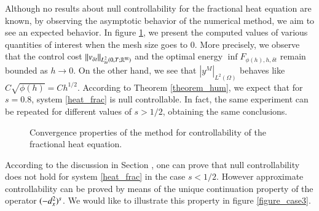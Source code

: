 Although no results about null controllability for the fractional heat equation are known, by observing the asymptotic behavior of the numerical method, we aim to see an expected behavior. In figure \ref{figure_case1}, we present the computed values of various quantities of interest when the mesh size goes to $0$. More precisely, we observe that the control cost $\|v_{\delta t}\|_{L^2_{\delta t}(0,T;\mathbb R^{\mathfrak{M}})}$ and the optimal energy $\inf F_{\phi(h),h,\delta t}$ remain bounded as $h\to 0$. On the other hand, we see that $|y^M|_{L^2(\Omega)}$ behaves like $C\sqrt{\phi(h)}=Ch^{1/2}$. According to Theorem \ref{theorem_hum}, we expect that for $s=0.8$, system \eqref{heat_frac} is null controllable. In fact, the same experiment can be repeated for different values of $s>1/2$, obtaining the same conclusions. 
%
\begin{figure}
  \centering
{}
\caption{Convergence properties of the method for controllability of the fractional heat equation. }\label{figure_case1}
\end{figure}

According to the discussion in Section , one can prove that null controllability does not hold for system \eqref{heat_frac} in the case $s<1/2$. However approximate controllability can be proved by means of the unique continuation property of the operator $(-d_x^2)^{s}$. We would like to illustrate this property in figure \ref{figure_case3}. 

